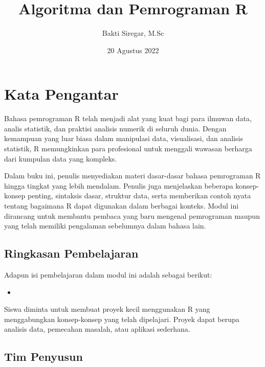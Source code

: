 \documentclass[
]{book}
\title{Algoritma dan Pemrograman R}
\author{Bakti Siregar, M.Sc}
\date{20 Agustus 2022}
\providecommand{\tightlist}{%
  \setlength{\itemsep}{0pt}\setlength{\parskip}{0pt}}
\begin{document}
\maketitle

{
\setcounter{tocdepth}{1}
\tableofcontents
}
\hypertarget{kata-pengantar}{%
\chapter*{Kata Pengantar}\label{kata-pengantar}}

Bahasa pemrograman R telah menjadi alat yang kuat bagi para ilmuwan data, analis statistik, dan praktisi analisis numerik di seluruh dunia. Dengan kemampuan yang luar biasa dalam manipulasi data, visualisasi, dan analisis statistik, R memungkinkan para profesional untuk menggali wawasan berharga dari kumpulan data yang kompleks.

Dalam buku ini, penulis menyediakan materi dasar-dasar bahasa pemrograman R hingga tingkat yang lebih mendalam. Penulis juga menjelaskan beberapa konsep-konsep penting, sintaksis dasar, struktur data, serta memberikan contoh nyata tentang bagaimana R dapat digunakan dalam berbagai konteks. Modul ini dirancang untuk membantu pembaca yang baru mengenal pemrograman maupun yang telah memiliki pengalaman sebelumnya dalam bahasa lain.

\hypertarget{ringkasan-pembelajaran}{%
\section*{Ringkasan Pembelajaran}\label{ringkasan-pembelajaran}}

Adapun isi pembelajaran dalam modul ini adalah sebagai berikut:

\begin{itemize}
\tightlist
\item
\end{itemize}

Siswa diminta untuk membuat proyek kecil menggunakan R yang menggabungkan konsep-konsep yang telah dipelajari. Proyek dapat berupa analisis data, pemecahan masalah, atau aplikasi sederhana.

\hypertarget{tim-penyusun}{%
\section*{Tim Penyusun}\label{tim-penyusun}}
\end{document}

